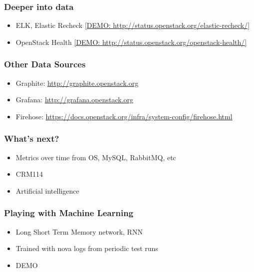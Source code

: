 \documentclass[aspectratio=169,11pt,hyperref={colorlinks=true}]{beamer}
\begin{document}

\begin{frame}
    \frametitle{Deeper into data}
    \begin{itemize}
        \item{ELK, Elastic Recheck \href{http://status.openstack.org/elastic-recheck/}{[DEMO: http://status.openstack.org/elastic-recheck/]}}
        \item{OpenStack Health \href{http://status.openstack.org/openstack-health/\#/}{[DEMO: http://status.openstack.org/openstack-health/]}}
    \end{itemize}
\end{frame}


\begin{frame}
    \frametitle{Other Data Sources}
    \begin{itemize}
        \item{Graphite: \href{http://graphite.openstack.org}{http://graphite.openstack.org}}
        \item{Grafana: \href{http://grafana.openstack.org}{http://grafana.openstack.org}}
        \item{Firehose: \href{https://docs.openstack.org/infra/system-config/firehose.html}{https://docs.openstack.org/infra/system-config/firehose.html}}
    \end{itemize}
\end{frame}


\begin{frame}
    \frametitle{What's next?}
    \begin{itemize}
        \item{Metrics over time from OS, MySQL, RabbitMQ, etc}
        \item{CRM114}
        \item{Artificial intelligence}
    \end{itemize}
\end{frame}

\begin{frame}
    \frametitle{Playing with Machine Learning}
    \begin{itemize}
        \item{Long Short Term Memory network, RNN}
        \item{Trained with nova logs from periodic test runs}
    \end{itemize}
    \begin{itemize}
        \item{DEMO}
    \end{itemize}
\end{frame}
\end{document}
